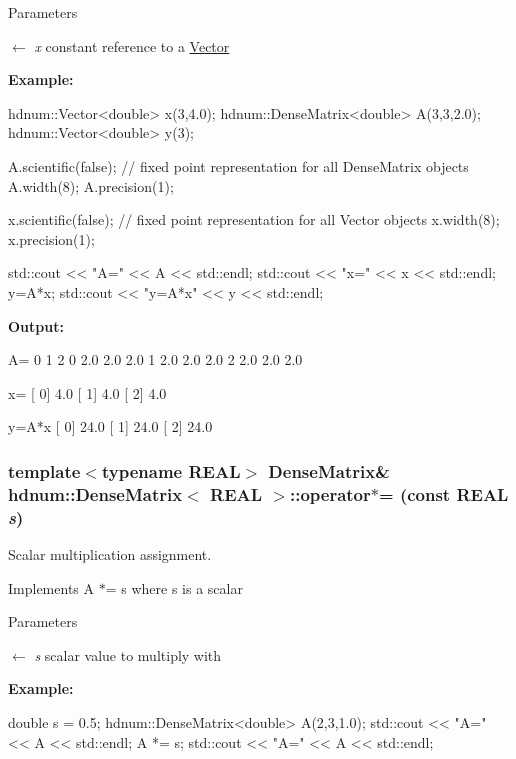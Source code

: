 \begin{DoxyParams}{Parameters}
\item[\mbox{$\leftarrow$} {\em x}]constant reference to a \hyperlink{classhdnum_1_1Vector}{Vector}\end{DoxyParams}
{\bfseries Example:} 
\begin{DoxyCode}
  hdnum::Vector<double> x(3,4.0);
  hdnum::DenseMatrix<double> A(3,3,2.0);
  hdnum::Vector<double> y(3);

  A.scientific(false); // fixed point representation for all DenseMatrix objects
  A.width(8);
  A.precision(1);
  
  x.scientific(false); // fixed point representation for all Vector objects
  x.width(8);
  x.precision(1);


  std::cout << "A=" << A << std::endl;
  std::cout << "x=" << x << std::endl;
  y=A*x;
  std::cout << "y=A*x" << y << std::endl;
\end{DoxyCode}


{\bfseries Output:} \begin{DoxyVerb}
A=
                    0        1        2 
          0       2.0      2.0      2.0 
          1       2.0      2.0      2.0 
          2       2.0      2.0      2.0 

x=
[ 0]     4.0
[ 1]     4.0
[ 2]     4.0

y=A*x
[ 0]    24.0
[ 1]    24.0
[ 2]    24.0
	  \end{DoxyVerb}
 \hypertarget{classhdnum_1_1DenseMatrix_a0681152377c82cc1bffa0384577e3d6b}{
\subsubsection[{operator$\ast$=}]{\setlength{\rightskip}{0pt plus 5cm}template$<$typename REAL$>$ {\bf DenseMatrix}\& {\bf hdnum::DenseMatrix}$<$ REAL $>$::operator$\ast$= (const REAL {\em s})}}
\label{classhdnum_1_1DenseMatrix_a0681152377c82cc1bffa0384577e3d6b}


Scalar multiplication assignment. 

Implements A $\ast$= s where s is a scalar


\begin{DoxyParams}{Parameters}
\item[\mbox{$\leftarrow$} {\em s}]scalar value to multiply with\end{DoxyParams}
{\bfseries Example:} 
\begin{DoxyCode}
          double s = 0.5;
          hdnum::DenseMatrix<double> A(2,3,1.0);
          std::cout << "A=" << A << std::endl;
          A *= s;
          std::cout << "A=" << A << std::endl;
\end{DoxyCode}


